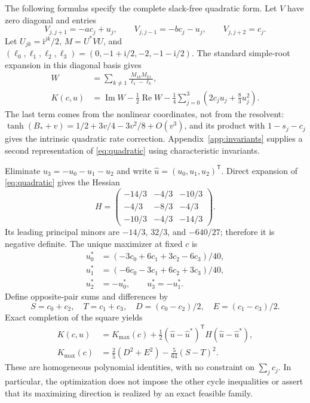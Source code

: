 \documentclass[11pt,a4paper]{article}
\newcommand{\Rea}{\operatorname{Re}}
\newcommand{\Ima}{\operatorname{Im}}
\newcommand{\ii}{\mathrm i}
\newcommand{\Bstar}{B_*}
\newcommand{\trans}{^{\mathsf T}}
\begin{document}
The following formulas specify the complete slack-free quadratic form.
Let $V$ have zero diagonal and entries
\begin{equation}\label{eq:V}
 V_{j,j+1}=-ac_j+u_j,\qquad
 V_{j,j-1}=-bc_j-u_j,\qquad V_{j,j+2}=c_j.
\end{equation}
Let $U_{jk}=\ii^{jk}/2$, $M=U^*VU$, and
$(\ell_0,\ell_1,\ell_2,\ell_3)=(0,-1+\ii/2,-2,-1-\ii/2)$.
The standard simple-root expansion in this diagonal basis gives
\begin{align}
 W&=\sum_{k\ne1}\frac{M_{1k}M_{k1}}{\ell_1-\ell_k},\nonumber\\
 K(c,u)&=\Ima W-\tfrac12\Rea W
       -\frac14\sum_{j=0}^3\left(2c_ju_j+\frac83u_j^2\right).
       \label{eq:quadratic}
\end{align}
The last term comes from the nonlinear coordinates, not from the
resolvent: $\tanh(\Bstar+v)=1/2+3v/4-3v^2/8+O(v^3)$, and its
product with $1-s_j-c_j$ gives the intrinsic quadratic rate correction.
Appendix~\ref{app:invariants} supplies a second representation of
\eqref{eq:quadratic} using characteristic invariants.

Eliminate $u_3=-u_0-u_1-u_2$ and write
$\widehat u=(u_0,u_1,u_2)\trans$. Direct expansion of
\eqref{eq:quadratic} gives the Hessian
\begin{equation}\label{eq:hessian}
 H=\begin{pmatrix}
 -14/3&-4/3&-10/3\\
 -4/3&-8/3&-4/3\\
 -10/3&-4/3&-14/3
 \end{pmatrix}.
\end{equation}
Its leading principal minors are $-14/3$, $32/3$, and $-640/27$;
therefore it is negative definite. The unique maximizer at fixed $c$ is
\begin{align}
 u_0^*&=(-3c_0+6c_1+3c_2-6c_3)/40,\nonumber\\
 u_1^*&=(-6c_0-3c_1+6c_2+3c_3)/40,\label{eq:optimizer}\\
 u_2^*&=-u_0^*,\qquad u_3^*=-u_1^*.\nonumber
\end{align}
Define opposite-pair sums and differences by
\begin{equation}\label{eq:pairs}
 S=c_0+c_2,\quad T=c_1+c_3,\quad
 D=(c_0-c_2)/2,\quad E=(c_1-c_3)/2.
\end{equation}
Exact completion of the square yields
\begin{align}
 K(c,u)&=K_{\max}(c)+\tfrac12(\widehat u-\widehat u^*)\trans
                         H(\widehat u-\widehat u^*),\label{eq:completion}\\
 K_{\max}(c)&=\frac25(D^2+E^2)-\frac5{64}(S-T)^2.\label{eq:Kmax}
\end{align}
These are homogeneous polynomial identities, with no constraint on
$\sum_jc_j$. In particular, the optimization does not impose the
other cycle inequalities or assert that its maximizing direction is
realized by an exact feasible family.
\end{document}
